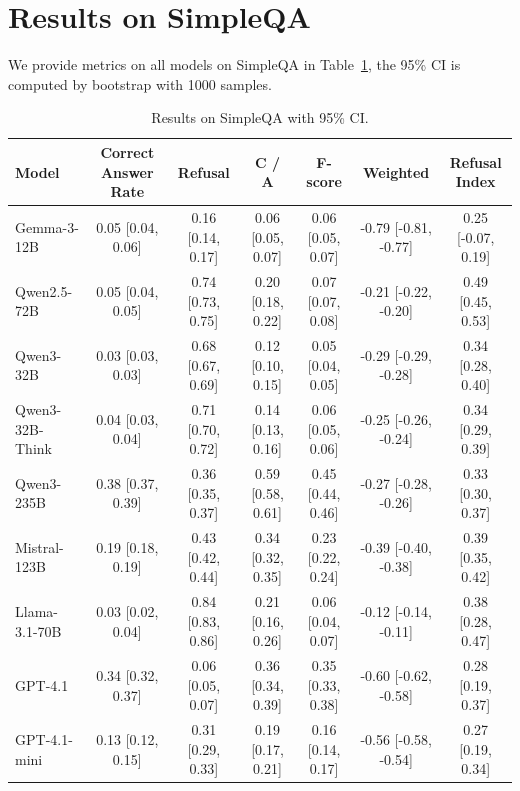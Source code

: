 \documentclass{article} %
\theoremstyle{definition}
\begin{document}
\section{Results on SimpleQA}
\label{sec:simpleqa_evaluation}

We provide metrics on all models on SimpleQA in Table~\ref{tab:simpleqa_model_comparison}, the 95\% CI is computed by bootstrap with 1000 samples.

\begin{table}[h]
    \centering
    \tiny
    \caption{Results on SimpleQA with 95\% CI.}
    \label{tab:simpleqa_model_comparison}
    \begin{tabularx}{\textwidth}{X c c c c c c}
    \toprule
    \textbf{Model} & \textbf{Correct Answer Rate} & \textbf{Refusal} & \textbf{C / A} & \textbf{F-score} & \textbf{Weighted} & \textbf{Refusal Index} \\
    \midrule
    Gemma-3-12B                     & 0.05 [0.04, 0.06] & 0.16 [0.14, 0.17] & 0.06 [0.05, 0.07] & 0.06 [0.05, 0.07] & -0.79 [-0.81, -0.77] & 0.25 [-0.07, 0.19] \\
    Qwen2.5-72B                    & 0.05 [0.04, 0.05] & 0.74 [0.73, 0.75] & 0.20 [0.18, 0.22] & 0.07 [0.07, 0.08] & -0.21 [-0.22, -0.20] & 0.49 [0.45, 0.53] \\
    Qwen3-32B                      & 0.03 [0.03, 0.03] & 0.68 [0.67, 0.69] & 0.12 [0.10, 0.15] & 0.05 [0.04, 0.05] & -0.29 [-0.29, -0.28] & 0.34 [0.28, 0.40] \\
    Qwen3-32B-Think                & 0.04 [0.03, 0.04] & 0.71 [0.70, 0.72] & 0.14 [0.13, 0.16] & 0.06 [0.05, 0.06] & -0.25 [-0.26, -0.24] & 0.34 [0.29, 0.39] \\
    Qwen3-235B                     & 0.38 [0.37, 0.39] & 0.36 [0.35, 0.37] & 0.59 [0.58, 0.61] & 0.45 [0.44, 0.46] & -0.27 [-0.28, -0.26] & 0.33 [0.30, 0.37] \\
    Mistral-123B                   & 0.19 [0.18, 0.19] & 0.43 [0.42, 0.44] & 0.34 [0.32, 0.35] & 0.23 [0.22, 0.24] & -0.39 [-0.40, -0.38] & 0.39 [0.35, 0.42] \\
    Llama-3.1-70B                  & 0.03 [0.02, 0.04] & 0.84 [0.83, 0.86] & 0.21 [0.16, 0.26] & 0.06 [0.04, 0.07] & -0.12 [-0.14, -0.11] & 0.38 [0.28, 0.47] \\
    GPT-4.1                        & 0.34 [0.32, 0.37] & 0.06 [0.05, 0.07] & 0.36 [0.34, 0.39] & 0.35 [0.33, 0.38] & -0.60 [-0.62, -0.58] & 0.28 [0.19, 0.37] \\
    GPT-4.1-mini                   & 0.13 [0.12, 0.15] & 0.31 [0.29, 0.33] & 0.19 [0.17, 0.21] & 0.16 [0.14, 0.17] & -0.56 [-0.58, -0.54] & 0.27 [0.19, 0.34] \\

\end{tabularx}
\end{table}
\end{document}
